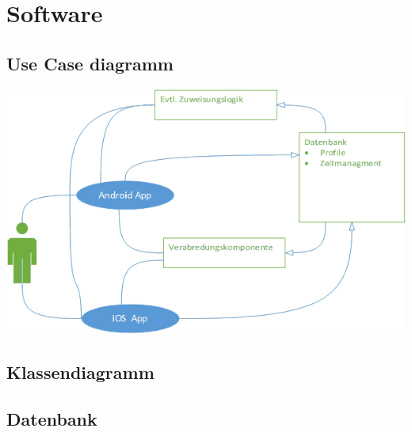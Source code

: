 \chapter{Software}

\section{Use Case diagramm}
\includegraphics{bilder/useCase.png}
\section{Klassendiagramm}

\section{Datenbank}

\centering{\Huge{$\vdots$}}